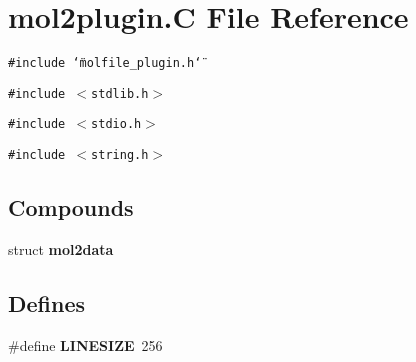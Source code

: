 \section{mol2plugin.C File Reference}
\label{mol2plugin_8C}
{\tt \#include \char`\"{}molfile\_\-plugin.h\char`\"{}}\par
{\tt \#include $<$stdlib.h$>$}\par
{\tt \#include $<$stdio.h$>$}\par
{\tt \#include $<$string.h$>$}\par
\subsection*{Compounds}
\begin{CompactItemize}
\item 
struct {\bf mol2data}
\end{CompactItemize}
\subsection*{Defines}
\begin{CompactItemize}
\item 
\#define {\bf LINESIZE}\ 256
\end{CompactItemize}
